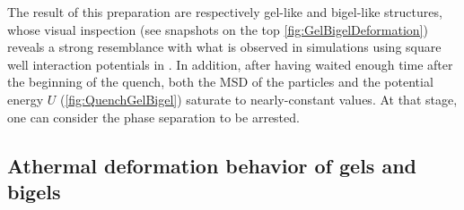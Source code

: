 The result of this preparation are respectively gel-like and bigel-like structures, whose visual inspection (see snapshots on the top \autoref{fig:GelBigelDeformation}) reveals a strong resemblance with what is observed in simulations using square well interaction potentials in \cite{varrato2012arrested}. In addition, after having waited enough time after the beginning of the quench, both the MSD of the particles and the potential energy $U$ (\autoref{fig:QuenchGelBigel}) saturate to nearly-constant values. At that stage, one can consider the phase separation to be arrested.

\pagebreak

\subsection*{Athermal deformation behavior of gels and bigels}

